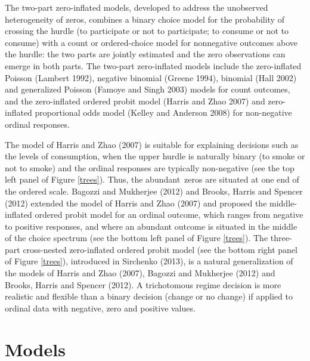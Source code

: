 \documentclass[letterpaper,fleqn,12pt]{article}
\begin{document}
\begin{onehalfspace}
The two-part zero-inflated models, developed to address the unobserved
heterogeneity of zeros, combines a binary choice model for the probability
of crossing the hurdle (to participate or not to participate; to consume or
not to consume) with a count or ordered-choice model for nonnegative
outcomes above the hurdle: the two parts are jointly estimated and the zero
observations can emerge in both parts. The two-part zero-inflated models
include the zero-inflated Poisson (Lambert 1992), negative binomial (Greene
1994), binomial (Hall 2002) and generalized Poisson (Famoye and Singh 2003)
models for count outcomes, and the zero-inflated ordered probit model
(Harris and Zhao 2007) and zero-inflated proportional odds model (Kelley and
Anderson 2008) for non-negative ordinal responses.

The model of Harris and Zhao (2007) is suitable for explaining decisions
such as the levels of consumption, when the upper hurdle is naturally binary
(to smoke or not to smoke) and the ordinal responses are typically
non-negative (see the top left panel of Figure \ref{trees}). Thus, the
abundant\ zeros are situated at one end of the ordered scale. Bagozzi and
Mukherjee (2012) and Brooks, Harris and Spencer (2012) extended the model of
Harris and Zhao (2007) and proposed the middle-inflated ordered probit model
for an ordinal outcome, which ranges from negative to positive responses,
and where an abundant outcome is situated in the middle of the choice
spectrum (see the bottom left panel of Figure \ref{trees}). The three-part
cross-nested zero-inflated ordered probit model (see the bottom right panel
of Figure \ref{trees}), introduced in Sirchenko (2013), is a natural
generalization of the models of Harris and Zhao (2007), Bagozzi and
Mukherjee (2012) and Brooks, Harris and Spencer (2012). A trichotomous
regime decision is more realistic and flexible than a binary decision
(change or no change) if applied to ordinal data with negative, zero and
positive values.

\section{\noindent Models}


\end{onehalfspace}
\end{document}
